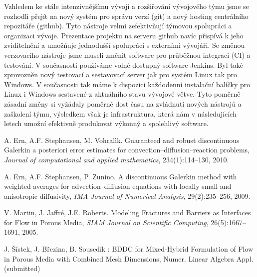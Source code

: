 \documentclass[11pt]{report}
\begin{document}
Vzhledem ke stále intenzivnějšímu vývoji a rozšiřování vývojového týmu jsme se 
rozhodli přejít na nový systém pro správu verzí (git) a nový hosting centrálního 
repozitáře (github). Tyto nástroje velmi zefektivňují týmovou spolupráci a 
organizaci vývoje. Prezentace projektu na serveru github navíc přispívá k jeho 
zviditelnění a umožňuje jednodušší spolupráci s externími vývojáři. Se změnou 
verzovacího nástroje jsme museli změnit software pro průběžnou integraci (CI) a 
testování. V současnosti používáme volně dostupný software Jenkins. Byl také 
zprovozněn nový testovací a sestavovací server jak pro systém Linux tak pro 
Windows. V současnosti tak máme k dispozici každodenní instalační balíčky pro 
Linux i Windows sestavené z aktuálního stavu vývojové větve.  Tyto poměrně 
zásadní změny si vyžádaly poměrně dost času na zvládnutí nových nástrojů a 
zaškolení týmu, výsledkem však je  infrastruktura, která nám v následujících 
letech umožní efektivně produkovat výkonný a spolehlivý software.


\begin{thebibliography}{99}

A. Ern, A.F. Stephansen, M. Vohral{\'\i}k.
Guaranteed and robust discontinuous Galerkin a posteriori error estimates for convection--diffusion--reaction problems,
\emph{Journal of computational and applied mathematics}, 234(1):114--130, 2010.


A. Ern, A.F. Stephansen, P. Zunino.
A discontinuous {G}alerkin method with weighted averages for advection--diffusion equations with locally small and anisotropic diffusivity,
\emph{IMA Journal of Numerical Analysis}, 29(2):235--256, 2009.


V. Martin, J. Jaffr{\'e}, J.E. Roberts.
Modeling Fractures and Barriers as Interfaces for Flow in Porous Media,
\emph{{SIAM} Journal on Scientific Computing}, 26(5):1667--1691, 2005.


J. Šístek, J. Březina, B. Sousedík : BDDC for Mixed-Hybrid 
Formulation of Flow in Porous Media with Combined Mesh Dimensions, Numer. Linear 
Algebra Appl. (submitted)
\end{thebibliography}
\end{document}
